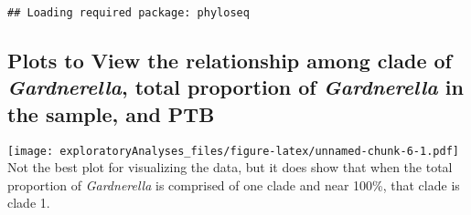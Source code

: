 \documentclass[]{article}
\newenvironment{Shaded}{\begin{snugshade}}{\end{snugshade}}
\newcommand{\KeywordTok}[1]{\textcolor[rgb]{0.13,0.29,0.53}{\textbf{{#1}}}}
\newcommand{\DataTypeTok}[1]{\textcolor[rgb]{0.13,0.29,0.53}{{#1}}}
\newcommand{\StringTok}[1]{\textcolor[rgb]{0.31,0.60,0.02}{{#1}}}
\newcommand{\NormalTok}[1]{{#1}}
\begin{document}
\begin{verbatim}
## Loading required package: phyloseq
\end{verbatim}

\begin{Shaded}
\end{Shaded}

\subsection{\texorpdfstring{Plots to View the relationship among clade
of \emph{Gardnerella}, total proportion of \emph{Gardnerella} in the
sample, and
PTB}{Plots to View the relationship among clade of Gardnerella, total proportion of Gardnerella in the sample, and PTB}}\label{plots-to-view-the-relationship-among-clade-of-gardnerella-total-proportion-of-gardnerella-in-the-sample-and-ptb}

\begin{Shaded}
\end{Shaded}

\texttt{[image: exploratoryAnalyses\_files/figure-latex/unnamed-chunk-6-1.pdf]}
\n Not the best plot for visualizing the data, but it does show that
when the total proportion of \emph{Gardnerella} is comprised of one
clade and near 100\%, that clade is clade 1.
\end{document}
